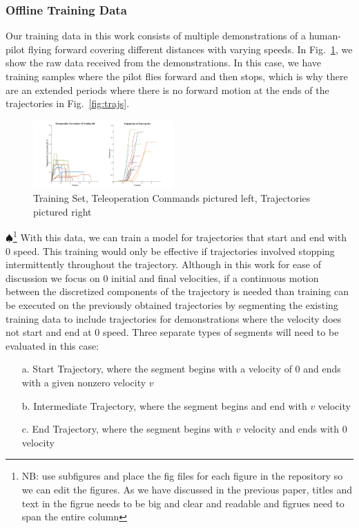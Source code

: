 \documentclass[letterpaper, 10 pt, conference]{ieeeconf}  %
\newcommand\NB[1]{$\spadesuit$\footnote{NB: #1}}
\begin{document}
\subsubsection{Offline Training Data}

Our training data in this work consists of multiple demonstrations of a human-pilot flying forward covering different distances with varying speeds.
In Fig.~\ref{fig:train}, we show the raw data received from the demonstrations. In this case, we have training samples where the pilot flies forward and then stops, which is why there are an extended periods where there is no forward motion at the ends of the trajectories in Fig.~\ref{fig:trajs}.

\begin{figure}[ht]
    \includegraphics[width=0.48\textwidth]{images/training.png}
    \caption{Training Set, Teleoperation Commands pictured left, Trajectories pictured right}
    \label{fig:train}
\end{figure}
\NB{use subfigures and place the fig files for each figure in the repository so we can edit the figures. As we have discussed in the previous paper, titles and text in the figrue needs to be big and clear and readable and figrues need to span the entire column }
With this data, we can train a model for trajectories that start and end with $0$ speed. This training would only be effective if trajectories involved stopping intermittently throughout the trajectory. Although in this work for ease of discussion we focus on 0 initial and final velocities, if a continuous motion between the discretized components of the trajectory is needed than training can be executed on the previously obtained trajectories by segmenting the existing training data to include trajectories for demonstrations where the velocity does not start and end at $0$ speed. Three separate types of segments will need to be evaluated in this case:
\begin{itemize}
    \item[a.] Start Trajectory, where the segment begins with a velocity of $0$ and ends with a given nonzero velocity $v$
    \item[b.] Intermediate Trajectory, where the segment begins and end with $v$ velocity
    \item[c.] End Trajectory, where the segment begins with $v$ velocity and ends with $0$ velocity
\end{itemize}
\end{document}
